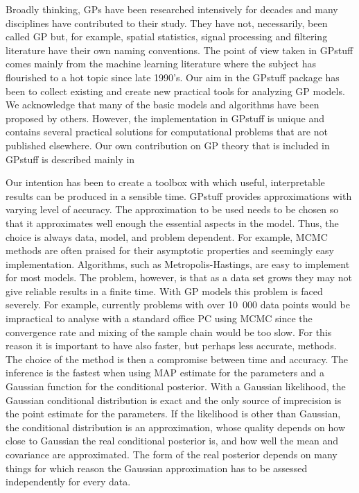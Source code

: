\documentclass[twoside,11pt]{article}
\newcommand{\pkg}[1]{{\fontseries{b}\selectfont #1}}
\begin{document}
Broadly thinking, GPs have been researched intensively for decades and
many disciplines have contributed to their study. They have not,
necessarily, been called GP but, for example, spatial statistics,
signal processing and filtering literature have their own naming
conventions. The point of view taken in \pkg{GPstuff} comes mainly
from the machine learning literature where the subject has flourished
to a hot topic since late 1990's. Our aim in the \pkg{GPstuff} package
has been to collect existing and create new practical tools for
analyzing GP models. We acknowledge that many of the basic models and
algorithms have been proposed by others. However, the implementation
in \pkg{GPstuff} is unique and contains several practical solutions
for computational problems that are not published elsewhere. Our own
contribution on GP theory that is included in \pkg{GPstuff} is
described mainly in
\citep{Vehtari:2001,Vehtari+Lampinen:2002,Vanhatalo+Vehtari:2007,Vanhatalo+Vehtari:2008,Vanhatalo+Vehtari:2010,Vanhatalo+Jylanki+Vehtari:2009,Vanhatalo+Pietilainen+Vehtari:2010,Jylanki+Vanhatalo+Vehtari:2011,Riihimaki+Vehtari:2012,Joensuu+etal:2012a,Riihimaki+Jylanki+Vehtari:2013,Joensuu+Reichardt+Eriksson+Hall+Vehtari:2014,Riihimaki+Vehtari:2014}

Our intention has been to create a toolbox with which useful,
interpretable results can be produced in a sensible time.
\pkg{GPstuff} provides approximations with varying level of accuracy.
The approximation to be used needs to be chosen so that it
approximates well enough the essential aspects in the model. Thus, the
choice is always data, model, and problem dependent. For example, MCMC
methods are often praised for their asymptotic properties and
seemingly easy implementation.  Algorithms, such as
Metropolis-Hastings, are easy to implement for most models. The
problem, however, is that as a data set grows they may not give
reliable results in a finite time. With GP models this problem is
faced severely. For example, currently problems with over 10~000 data
points would be impractical to analyse with a standard office PC using
MCMC since the convergence rate and mixing of the sample chain would
be too slow. For this reason it is important to have also faster, but
perhaps less accurate, methods.  The choice of the method is then a
compromise between time and accuracy. The inference is the fastest
when using MAP estimate for the parameters and a Gaussian function for
the conditional posterior.  With a Gaussian likelihood, the Gaussian
conditional distribution is exact and the only source of imprecision
is the point estimate for the parameters. If the likelihood is other
than Gaussian, the conditional distribution is an approximation, whose
quality depends on how close to Gaussian the real conditional
posterior is, and how well the mean and covariance are approximated.
The form of the real posterior depends on many things for which reason
the Gaussian approximation has to be assessed independently for every
data.
\end{document}

